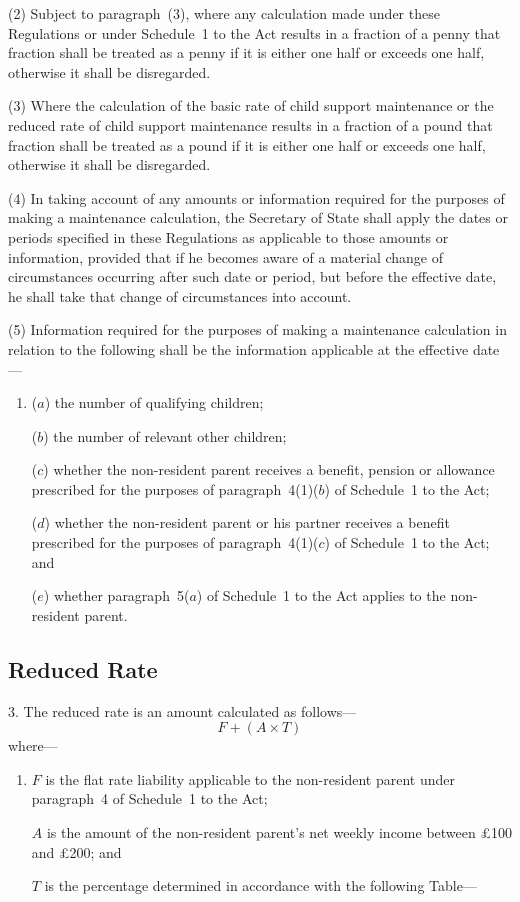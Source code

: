 \documentclass[12pt,a4paper]{article}
\begin{document}
(2) Subject to paragraph~(3), where any calculation made under these Regulations or under Schedule~1 to the Act results in a fraction of a penny that fraction shall be treated as a penny if it is either one half or exceeds one half, otherwise it shall be disregarded.

(3) Where the calculation of the basic rate of child support maintenance or the reduced rate of child support maintenance results in a fraction of a pound that fraction shall be treated as a pound if it is either one half or exceeds one half, otherwise it shall be disregarded.

(4) In taking account of any amounts or information required for the purposes of making a maintenance calculation, the Secretary of State shall apply the dates or periods specified in these Regulations as applicable to those amounts or information, provided that if he becomes aware of a material change of circumstances occurring after such date or period, but before the effective date, he shall take that change of circumstances into account.

(5) Information required for the purposes of making a maintenance calculation in relation to the following shall be the information applicable at the effective date—
\begin{enumerate}\item[]
($a$) the number of qualifying children;

($b$) the number of relevant other children;

($c$) whether the non-resident parent receives a benefit, pension or allowance prescribed for the purposes of paragraph~4(1)($b$)  of Schedule~1 to the Act;

($d$) whether the non-resident parent or his partner receives a benefit prescribed for the purposes of paragraph~4(1)($c$)  of Schedule~1 to the Act; and

($e$) whether paragraph~5($a$)  of Schedule~1 to the Act applies to the non-resident parent.
\end{enumerate}

\subsection[3. Reduced Rate]{Reduced Rate}

3.  The reduced rate is an amount calculated as follows—
\[F + (A \times T)\]
where—
\begin{enumerate}\item[]
    $F$ is the flat rate liability applicable to the non-resident parent under paragraph~4 of Schedule~1 to the Act;

    $A$ is the amount of the non-resident parent’s net weekly income between £100 and £200; and

    $T$ is the percentage determined in accordance with the following Table— 
\end{enumerate}
\end{document}
